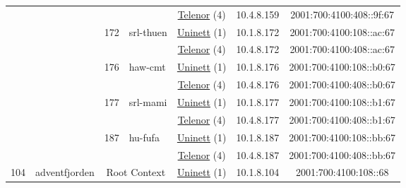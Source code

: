 \begin{small}
\begin{center}
\begin{longtable}{|c|c|c|c|c|c|c|c|}
  &  &  &  & \multicolumn{2}{|c|}{\tiny{\href{https://www.telenor.no}{Telenor} (4)}} & \tiny{10.4.8.159} & \tiny{2001:700:4100:408::9f:67} \\* \cline{3-3}\cline{4-4}\cline{5-5}\cline{6-6}\cline{7-7}\cline{8-8}
  &  & \multirow{2}{*}{\tiny{172}} & \multicolumn{1}{|l|}{\multirow{2}{*}{\tiny{srl-thuen}}} & \multicolumn{2}{|c|}{\tiny{\href{https://www.uninett.no}{Uninett} (1)}} & \tiny{10.1.8.172} & \tiny{2001:700:4100:108::ac:67} \\* \cline{5-5}\cline{6-6}\cline{7-7}\cline{8-8}
  &  &  &  & \multicolumn{2}{|c|}{\tiny{\href{https://www.telenor.no}{Telenor} (4)}} & \tiny{10.4.8.172} & \tiny{2001:700:4100:408::ac:67} \\* \cline{3-3}\cline{4-4}\cline{5-5}\cline{6-6}\cline{7-7}\cline{8-8}
  &  & \multirow{2}{*}{\tiny{176}} & \multicolumn{1}{|l|}{\multirow{2}{*}{\tiny{haw-cmt}}} & \multicolumn{2}{|c|}{\tiny{\href{https://www.uninett.no}{Uninett} (1)}} & \tiny{10.1.8.176} & \tiny{2001:700:4100:108::b0:67} \\* \cline{5-5}\cline{6-6}\cline{7-7}\cline{8-8}
  &  &  &  & \multicolumn{2}{|c|}{\tiny{\href{https://www.telenor.no}{Telenor} (4)}} & \tiny{10.4.8.176} & \tiny{2001:700:4100:408::b0:67} \\* \cline{3-3}\cline{4-4}\cline{5-5}\cline{6-6}\cline{7-7}\cline{8-8}
  &  & \multirow{2}{*}{\tiny{177}} & \multicolumn{1}{|l|}{\multirow{2}{*}{\tiny{srl-mami}}} & \multicolumn{2}{|c|}{\tiny{\href{https://www.uninett.no}{Uninett} (1)}} & \tiny{10.1.8.177} & \tiny{2001:700:4100:108::b1:67} \\* \cline{5-5}\cline{6-6}\cline{7-7}\cline{8-8}
  &  &  &  & \multicolumn{2}{|c|}{\tiny{\href{https://www.telenor.no}{Telenor} (4)}} & \tiny{10.4.8.177} & \tiny{2001:700:4100:408::b1:67} \\* \cline{3-3}\cline{4-4}\cline{5-5}\cline{6-6}\cline{7-7}\cline{8-8}
  &  & \multirow{2}{*}{\tiny{187}} & \multicolumn{1}{|l|}{\multirow{2}{*}{\tiny{hu-fufa}}} & \multicolumn{2}{|c|}{\tiny{\href{https://www.uninett.no}{Uninett} (1)}} & \tiny{10.1.8.187} & \tiny{2001:700:4100:108::bb:67} \\* \cline{5-5}\cline{6-6}\cline{7-7}\cline{8-8}
  &  &  &  & \multicolumn{2}{|c|}{\tiny{\href{https://www.telenor.no}{Telenor} (4)}} & \tiny{10.4.8.187} & \tiny{2001:700:4100:408::bb:67} \\ \hline
 \multirow{30}{*}{\tiny{104}} & \multicolumn{1}{|l|}{\multirow{30}{*}{\tiny{adventfjorden}}} & \multicolumn{2}{|c|}{\multirow{2}{*}{\tiny{Root Context}}} & \multicolumn{2}{|c|}{\tiny{\href{https://www.uninett.no}{Uninett} (1)}} & \tiny{10.1.8.104} & \tiny{2001:700:4100:108::68} \\* \cline{5-5}\cline{6-6}\cline{7-7}\cline{8-8}

\end{longtable}
\end{center}
\end{small}
